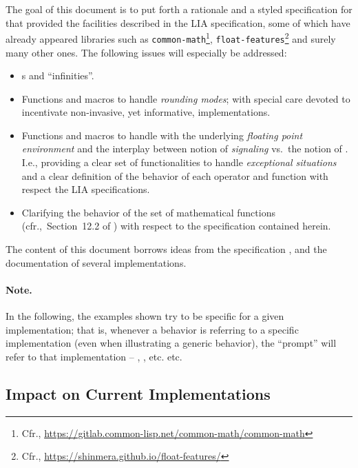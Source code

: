 \documentclass[../../CDR-IEEE-754-support.tex]{subfiles}
\begin{document}

The goal of this document is to put forth a rationale and a \ANSICL{}
styled specification for \CL{} that provided the facilities described
in the \IECLIA{} LIA specification, some of which have already appeared
libraries such as \texttt{common-math}\footnote{Cfr., \url{https://gitlab.common-lisp.net/common-math/common-math}}, \texttt{float-features}\footnote{Cfr., \url{https://shinmera.github.io/float-features/}} and surely many other ones.
%
The following issues will especially 
be addressed:
\begin{itemize}
\item {}s and ``infinities''.

\item Functions and macros to handle \emph{rounding modes}; with
  special care devoted to incentivate non-invasive, yet informative,
  implementations.

\item Functions and macros to handle with the underlying
  \emph{floating point environment} and the interplay between
  \IEEEFPStd{} notion of \emph{signaling} vs.~the \CL{} notion of
  .  I.e., providing a clear set of
  functionalities to handle \emph{exceptional situations} and a clear
  definition of the behavior of each operator and function with
  respect the LIA specifications.
  
\item Clarifying the behavior of the \CL{} set of mathematical
  functions (cfr.,~Section~12.2 of \cite{1996:ANSIHyperSpec}) with respect
  to the specification contained herein.
\end{itemize}

\vspace*{3mm}

The content of this document borrows ideas from the \CLang{}
specification \cite{2018:C18}, and the documentation of
several \CL{} implementations.

\paragraph{Note.} In the following, the examples shown try to be
specific for a given implementation; that is, whenever a behavior is
referring to a specific implementation (even when illustrating a
generic behavior), the ``prompt'' will refer to that implementation --
, , etc. etc.


\subsection{Impact on Current \CL{} Implementations}

\end{document}
